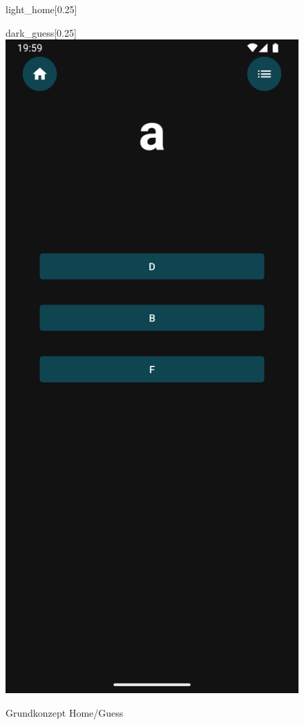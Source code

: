 \documentclass[12pt,a4paper]{article}
\begin{document}
\begin{figure}[h]
\begin{subcaptionbox}{light\_home\label{fig:bild1}}[0.25\linewidth]
    \end{subcaptionbox}
    \hfill
    \begin{subcaptionbox}{dark\_guess\label{fig:bild2}}[0.25\linewidth]
        {\includegraphics[width=\linewidth]{showcase/guess.png}}
    \end{subcaptionbox}
    \caption{Grundkonzept Home/Guess}
    \label{fig:nebeneinander}
\end{figure}
\end{document}
